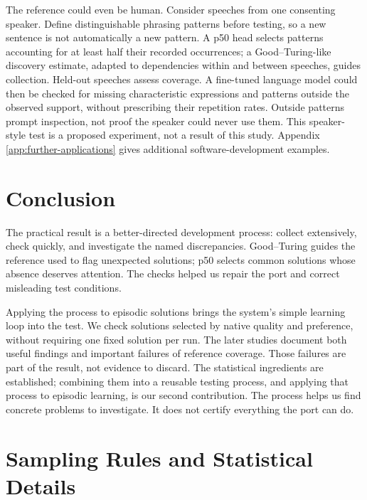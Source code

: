 \documentclass[10pt,letterpaper]{article}
\begin{document}
The reference could even be human. Consider speeches from one consenting speaker. Define
distinguishable phrasing patterns before testing, so a new sentence is not automatically a
new pattern. A p50 head selects patterns accounting for at least half their recorded
occurrences; a Good--Turing-like discovery estimate, adapted to dependencies within and
between speeches, guides collection. Held-out speeches assess coverage. A fine-tuned
language model could then be checked for missing characteristic expressions and patterns
outside the observed support, without prescribing their repetition rates. Outside patterns
prompt inspection, not proof the speaker could never use them. This speaker-style test is
a proposed experiment, not a result of this study. Appendix \ref{app:further-applications}
gives additional software-development examples.

\section{Conclusion}\label{sec:conclusion}

The practical result is a better-directed development process: collect extensively, check
quickly, and investigate the named discrepancies. Good--Turing guides the reference used
to flag unexpected solutions; p50 selects common solutions whose absence deserves
attention. The checks helped us repair the port and correct misleading test conditions.

Applying the process to episodic solutions brings the system's simple learning loop into
the test. We check solutions selected by native quality and preference, without requiring
one fixed solution per run. The later studies document both useful findings and important
failures of reference coverage. Those failures are part of the result, not evidence to
discard. The statistical ingredients are established; combining them into a reusable
testing process, and applying that process to episodic learning, is our second
contribution. The process helps us find concrete problems to investigate. It does not
certify everything the port can do.

\clearpage


\clearpage
\appendix

\section{Sampling Rules and Statistical Details}\label{app:statistics}
\end{document}
